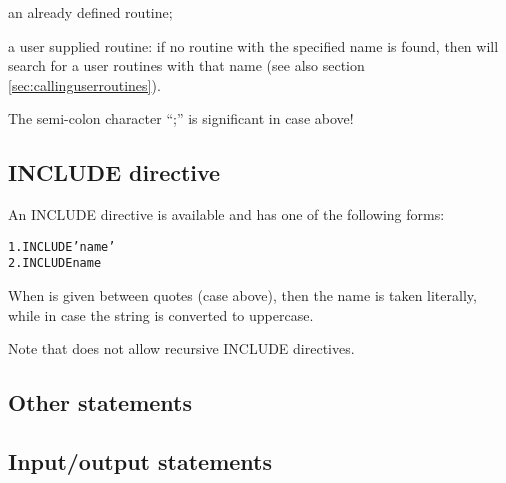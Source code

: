 \begin{UL}
  \item an already defined \COMIS{} routine;
  \item a user supplied routine: if no \COMIS{} routine with the specified name 
        is found, then \COMIS{} will search for a user routines with that
        name (see also section \ref{sec:callinguserroutines}).
\end{UL}

The semi-colon character ``;'' is significant in case  above!
 
\subsection*{INCLUDE directive}

An INCLUDE directive is available and has one of the following forms:

\begin{alltt}
  1.   INCLUDE 'name'
  2.   INCLUDE  name
\end{alltt}
 
When  is given between quotes (case  above),
then the name is taken literally, while in case  
the string  is converted to uppercase.

Note that \COMIS{} does not allow recursive INCLUDE directives.

\subsection{Other statements}
\index{\num}

\subsection{Input/output statements}
 
